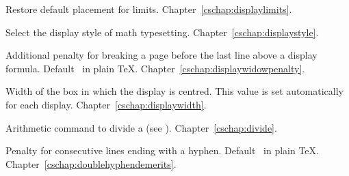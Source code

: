 \begin{glossinventory}
\item [\cs{displaylimits}]
      Restore default placement for limits.
Chapter~\ref{cschap:displaylimits}.

\item [\cs{displaystyle}]
      Select the display style of math typesetting.
Chapter~\ref{cschap:displaystyle}.

\item [\cs{displaywidowpenalty}]
      Additional penalty for breaking a page before the last line 
      above a display formula. 
      Default~ in plain \TeX.
Chapter~\ref{cschap:displaywidowpenalty}.

\item [\cs{displaywidth}]
      Width of the box in which the display is centred.
      This value is set automatically for each display.
Chapter~\ref{cschap:displaywidth}.

\item [\cs{divide\gr{numeric variable}\gr{optional \n{by}}\gr{number}}]
      Arithmetic command to divide a 
      (see ).
Chapter~\ref{cschap:divide}.

\item [\cs{doublehyphendemerits}]
      Penalty for consecutive lines ending with a hyphen. 
      Default~ in plain \TeX.
Chapter~\ref{cschap:doublehyphendemerits}.


\end{glossinventory}

